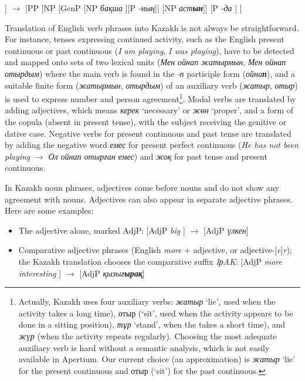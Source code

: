 \documentclass[11pt]{article}
\begin{document}
\begin{description}
\begin{itemize}
        [PP [P \emph{under} ] [NP \emph{the garden}] ] $\rightarrow$ [PP [NP [GenP [NP \emph{бақша} ][P \emph{-ның}]] [NP \emph{аст\textbf{ын}}]] [P \emph{-да} ] ]
    \end{itemize}
\item[Verb phrases:] Translation of English verb phrases into Kazakh is not always be straightforward. For instance,
tenses expressing continued activity, such as the 
  English present continuous or past continuous (\emph{I am playing}, \emph{I was playing}), have to be detected and 
  mapped onto sets of two lexical units (\emph{Мен ойнап жатырмын}, \emph{Мен ойнап отырдым}) where the main verb is 
  found in the \emph{-п} participle form (\emph{ойна\textbf{п}}), and a suitable finite form  (\emph{жатырмын}, \emph{отырдым}) of an auxiliary 
  verb (\emph{жатыр}, \emph{отыр}) is used to express number and person agreement\footnote{Actually, Kazakh uses four auxiliary verbs: \emph{жатыр} `lie', 
      used when the activity takes a long time), отыр (`sit', used when the activity appears to be done in a sitting position), \emph{тұр} `stand', 
      when the takes a short time), and \emph{жүр} (when the activity repeats regularly). Choosing the most adequate auxiliary verb is 
      hard without a semantic analysis, which is not easily available in Apertium. Our current choice (an approximation) 
      is \emph{жатыр} `lie' for the present continuous and отыр (`sit') for the past continuous.}. Modal verbs are translated by adding adjectives, which means \emph{керек} `necessary' or \emph{жөн} `proper', 
  and a form of the copula (absent in present tense), with the subject receiving the genitive or dative case. Negative 
  verbs for present continuous and past tense are translated by adding the negative word \emph{емес} for present 
  perfect continuous (\emph{He has not been playing} \(\to\) \emph{Ол ойнап отырған емес}) and  \emph{жоқ} for past tense and 
  present continuous.
\item[Adjectival phrases:] In Kazakh noun phrases, adjectives come before nouns and do not show any agreement 
  with nouns.  Adjectives can also appear in separate adjective phrases. Here are some examples:
\begin{itemize}
\item The adjective alone, marked AdjP: [AdjP \emph{big} ] $\rightarrow$ [AdjP \emph{үлкен}] 
\item Comparative adjective phrases  (English \emph{more} + adjective, or adjective-[\emph{e}]\emph{r}); the Kazakh translation 
   chooses the comparative suffix \emph{{I}р{A}{K}}: [AdjP  \emph{more  interesting} ]  $\rightarrow$ [AdjP \emph{қызығ\textbf{ырақ}}]

\end{itemize}
\end{description}
\end{document}
